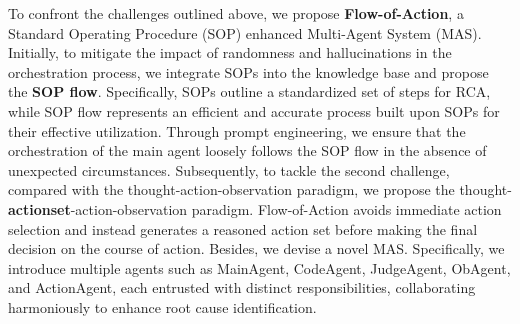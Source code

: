 To confront the challenges outlined above, we propose \textbf{Flow-of-Action}, a Standard Operating Procedure (SOP) enhanced Multi-Agent System (MAS). Initially, to mitigate the impact of randomness and hallucinations in the orchestration process, we integrate SOPs into the knowledge base and propose the \textbf{SOP flow}. Specifically, SOPs outline a standardized set of steps for RCA, while SOP flow represents an efficient and accurate process built upon SOPs for their effective utilization. Through prompt engineering, we ensure that the orchestration of the main agent loosely follows the SOP flow in the absence of unexpected circumstances. Subsequently, to tackle the second challenge, compared with the thought-action-observation paradigm, we propose the thought-\textbf{actionset}-action-observation paradigm. Flow-of-Action avoids immediate action selection and instead generates a reasoned action set before making the final decision on the course of action. Besides, we devise a novel MAS. Specifically, we introduce multiple agents such as MainAgent, CodeAgent, JudgeAgent, ObAgent, and ActionAgent, each entrusted with distinct responsibilities, collaborating harmoniously to enhance root cause identification. 

